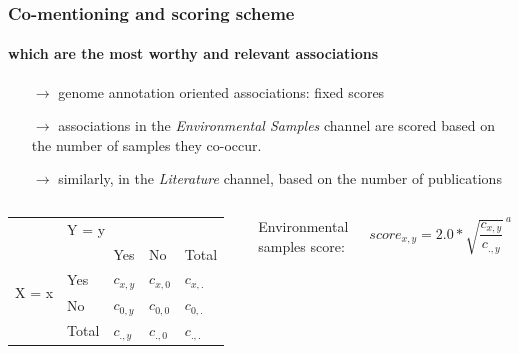 \documentclass{beamer}
\begin{document}
   \begin{frame}
      \frametitle{Co-mentioning and scoring scheme }
      \framesubtitle{which are the most worthy and relevant associations}

      \small
      \begin{itemize}
         \item [$\rightarrow$] genome annotation oriented associations: fixed scores
         \item [$\rightarrow$] associations in the \textit{Environmental Samples} channel are scored based on the number of samples they co-occur. 
         \item [$\rightarrow$] similarly, in the \textit{Literature} channel, based on the number of publications
      \end{itemize}
 
      \begin{columns}[onlytextwidth]
            \begin{table}[ht]
               \begin{tabular}{c|llll}
                & \multicolumn{4}{l}{Y = y} \\ \cline{2-5} 
               \multirow{4}{*}{X = x} &  & Yes & No & Total \\ \cline{3-5} 
                & \multicolumn{1}{l|}{Yes} & $c_{x,y}$ & $c_{x,0}$ & $c_{x,.}$ \\
                & \multicolumn{1}{l|}{No} & $c_{0,y}$ & $c_{0,0}$ & $c_{0,.}$ \\
                & \multicolumn{1}{l|}{Total} & $c_{.,y}$ & $c_{.,0}$ & $c_{.,.}$
               \end{tabular}
            \end{table}

               Environmental samples score: 

                  \begin{equation}
                     score_{x,y} = 2.0*\sqrt{\frac{c_{x,y}}{c_{.,y}}}^{ \:a}
                  \end{equation}

      \end{columns}



   \end{frame}
\end{document}
